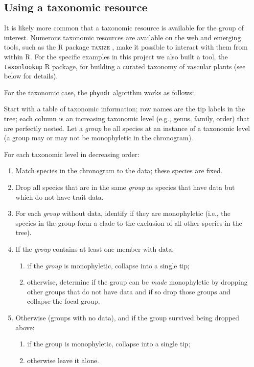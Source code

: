 \documentclass[a4paper,11pt]{article}
\newcommand{\phyndr}{\tt phyndr}
\newcommand{\taxonlookup}{\tt taxonlookup}
\begin{document}
\subsection{Using a taxonomic resource}

It is likely more common that a taxonomic resource is available for the group of interest. Numerous taxonomic resources are available on the web and emerging tools, such as the R package \textsc{taxize} \citep{taxize}, make it possible to interact with them from within R. For the specific examples in this project we also built a tool, the {\taxonlookup} R package, for building a curated taxonomy of vascular plants (see below for details).

For the taxonomic case, the {\phyndr} algorithm works as follows:

Start with a table of taxonomic information; row names are the tip labels in the tree; each column is an increasing taxonomic level (e.g., genus, family, order) that are perfectly nested.  Let a \emph{group} be all species at an instance of a taxonomic level (a group may or may not be monophyletic in the chronogram).

For each taxonomic level in decreasing order:
\begin{enumerate}
  \item Match species in the chronogram to the data; these species are fixed.
  \item Drop all species that are in the same \emph{group} as species that have data but which do not have trait data.
  \item For each \emph{group} without data, identify if they are monophyletic (i.e., the species in the group form a clade to the exclusion of all other species in the tree).
  \item If the \emph{group} contains at least one member with data:
    \begin{enumerate}
    \item if the \emph{group} is monophyletic, collapse into a single tip;
    \item otherwise, determine if the group can be \emph{made} monophyletic by dropping other groups that do not have data and if so drop those groups and collapse the focal group.
    \end{enumerate}
  \item Otherwise (groups with no data), and if the group survived being dropped above:
    \begin{enumerate}
    \item if the group is monophyletic, collapse into a single tip;
    \item otherwise leave it alone.
    \end{enumerate}
\end{enumerate}
\end{document}
